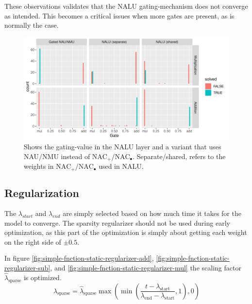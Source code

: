 These observations validates that the NALU gating-mechanism does not converge as intended. This becomes a critical issues when more gates are present, as is normally the case.

\begin{figure}[h]
\centering
\includegraphics[width=0.98\linewidth]{results/function_task_static_nalu.pdf}
\caption{Shows the gating-value in the NALU layer and a variant that uses NAU/NMU instead of $\mathrm{NAC}_{+}$/$\mathrm{NAC}_{\bullet}$. Separate/shared, refers to the weights in $\mathrm{NAC}_{+}$/$\mathrm{NAC}_{\bullet}$ used in NALU.}
\label{fig:simple-function-static-nalu-gate-graph}
\end{figure}



\subsection{Regularization}
\label{sec:appendix:simple-function-task:regualization}

The $\lambda_{start}$ and $\lambda_{end}$ are simply selected based on how much time it takes for the model to converge. The sparsity regularizer should not be used during early optimization, as this part of the optimization is simply about getting each weight on the right side of $\pm 0.5$.

In figure \ref{fig:simple-fnction-static-regularizer-add}, \ref{fig:simple-fnction-static-regularizer-sub}, and \ref{fig:simple-fnction-static-regularizer-mul} the scaling factor $\hat{\lambda}_{\mathrm{sparse}}$ is optimized.
\begin{equation}
\lambda_{\mathrm{sparse}} = \hat{\lambda}_{\mathrm{sparse}} \max(\min(\frac{t - \lambda_{\mathrm{start}}}{\lambda_{\mathrm{end}} - \lambda_{\mathrm{start}}}, 1), 0)
\end{equation}

